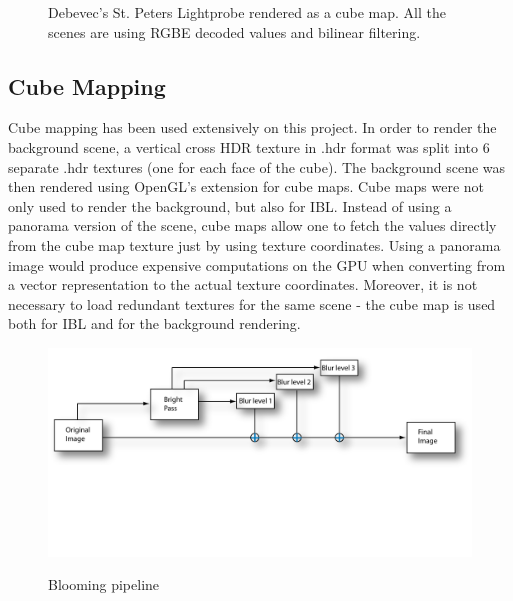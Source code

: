 \documentclass[twocolumn,8pt]{article}
\begin{document}
\begin{figure}[t]
\caption{Debevec's St. Peters Lightprobe rendered as a cube map. All the scenes are using RGBE decoded values and bilinear filtering.}
\label{fig:RGBEResTest}
\end{figure}

\subsection{Cube Mapping}
Cube mapping has been used extensively on this project. In order to render the background scene, a vertical cross HDR texture in .hdr format was split into 6 separate .hdr textures (one for each face of the cube). The background scene was then rendered using OpenGL's extension for cube maps. Cube maps were not only used to render the background, but also for IBL. Instead of using a panorama version of the scene, cube maps allow one to fetch the values directly from the cube map texture just by using texture coordinates. Using a panorama image would produce expensive computations on the GPU when converting from a vector representation to the actual texture coordinates. Moreover, it is not necessary to load redundant textures for the same scene - the cube map is used both for IBL and for 
the background rendering.

\begin{figure}[t]
\centering
{\includegraphics[scale=0.8]{./pics/bloomPipeline.pdf}} 
\caption{Blooming pipeline}
\label{fig:bloomPipeline}
\end{figure}
\end{document}
